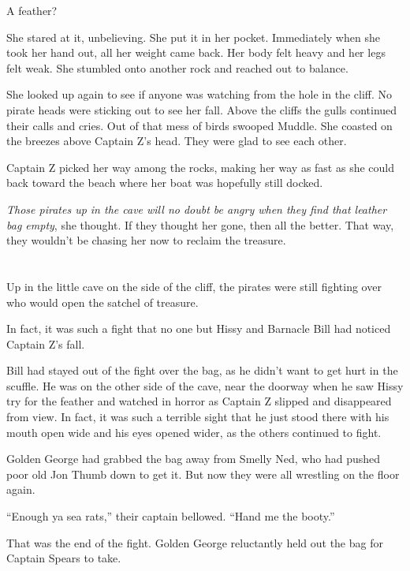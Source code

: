 \documentclass[12pt]{extbook}
\begin{document}
  A feather?
  
  She stared at it, unbelieving. She put it in her pocket. Immediately
  when she took her hand out, all her weight came back. Her body felt
  heavy and her legs felt weak. She stumbled onto another rock and reached
  out to balance.
  
  She looked up again to see if anyone was watching from the hole in the
  cliff. No pirate heads were sticking out to see her fall. Above the
  cliffs the gulls continued their calls and cries. Out of that mess of
  birds swooped Muddle. She coasted on the breezes above Captain Z's head.
  They were glad to see each other.
  
  Captain Z picked her way among the rocks, making her way as fast as she
  could back toward the beach where her boat was hopefully still docked.
  
  \emph{Those pirates up in the cave will no doubt be angry when they find
  that leather bag empty}, she thought. If they thought her gone, then all
  the better. That way, they wouldn't be chasing her now to reclaim the
  treasure.
  
  \section{}\label{section-23}
  
  Up in the little cave on the side of the cliff, the pirates were still
  fighting over who would open the satchel of treasure.
  
  In fact, it was such a fight that no one but Hissy and Barnacle Bill had
  noticed Captain Z's fall.
  
  Bill had stayed out of the fight over the bag, as he didn't want to get
  hurt in the scuffle. He was on the other side of the cave, near the
  doorway when he saw Hissy try for the feather and watched in horror as
  Captain Z slipped and disappeared from view. In fact, it was such a
  terrible sight that he just stood there with his mouth open wide and his
  eyes opened wider, as the others continued to fight.
  
  Golden George had grabbed the bag away from Smelly Ned, who had pushed
  poor old Jon Thumb down to get it. But now they were all wrestling on
  the floor again.
  
  \enquote{Enough ya sea rats,} their captain bellowed. \enquote{Hand me
  the booty.}
  
  That was the end of the fight. Golden George reluctantly held out the
  bag for Captain Spears to take.
  
\end{document}
